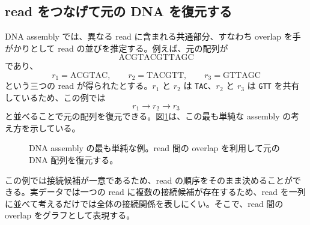 \documentclass[a4j,10pt]{ujarticle}
\begin{document}
\subsection{read をつなげて元の DNA を復元する}

DNA assembly では、異なる read に含まれる共通部分、すなわち overlap を手がかりとして read の並びを推定する。例えば、元の配列が
\[
\mathrm{ACGTACGTTAGC}
\]
であり、
\[
r_1=\mathrm{ACGTAC},\qquad
r_2=\mathrm{TACGTT},\qquad
r_3=\mathrm{GTTAGC}
\]
という三つの read が得られたとする。$r_1$ と $r_2$ は \texttt{TAC}、$r_2$ と $r_3$ は \texttt{GTT} を共有しているため、この例では
\[
r_1\rightarrow r_2\rightarrow r_3
\]
と並べることで元の配列を復元できる。図\ref{fig:assembly_simple}は、この最も単純な assembly の考え方を示している。


\begin{figure}[tbp]
\centering
{}

\caption{
DNA assembly の最も単純な例。read 間の overlap を利用して元の DNA 配列を復元する。
}
\label{fig:assembly_simple}
\end{figure}

この例では接続候補が一意であるため、read の順序をそのまま決めることができる。実データでは一つの read に複数の接続候補が存在するため、read を一列に並べて考えるだけでは全体の接続関係を表しにくい。そこで、read 間の overlap をグラフとして表現する。
\end{document}
